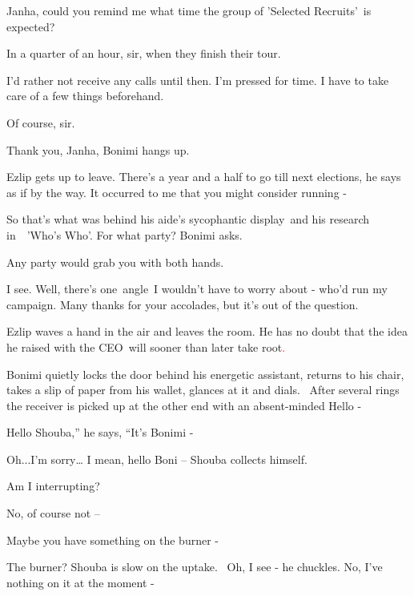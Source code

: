 \documentclass[letterpaper]{article}
\begin{document}
{\textquotedbl}Janha, could you remind me what time the group of {}'Selected Recruits{}'\textcolor{red}{\ }is
expected?{\textquotedbl}

{\textquotedbl}In a quarter of an hour, sir, when they finish their tour.{\textquotedbl} 

{\textquotedbl}I'd rather not receive any calls until then. I'm pressed for time. I have to take care of a few things
beforehand.{\textquotedbl} 

{\textquotedbl}Of course, sir.{\textquotedbl} 

{\textquotedbl}Thank you, Janha,{\textquotedbl} Bonimi hangs up. 

Ezlip gets up to leave. {\textquotedbl}There's a year and a half to go till next elections,{\textquotedbl} he says as if
by the way. {\textquotedbl}It occurred to me that you might consider running -{\textquotedbl}

So that's what was behind his aide's sycophantic display\textcolor{red}{\ }and his research in\ \ {}'Who's Who{}'.
{\textquotedbl}For what party?{\textquotedbl} Bonimi asks.

{\textquotedbl}Any party would grab you with both hands.{\textquotedbl} 

{\textquotedbl}I see. Well, there's one\ angle\ I wouldn't have to worry about - who'd run my campaign. Many thanks for
your accolades, but it's out of the question.{\textquotedbl}\ 

Ezlip waves a hand in the air and leaves the room. He has no doubt that the idea he raised with the CEO~will sooner than
later take root\textcolor{red}{.\ }

Bonimi quietly locks the door behind his energetic assistant, returns to his chair, takes a slip of paper from his
wallet, glances at it and dials.~ After several rings the receiver is picked up at the other end with an absent-minded
{\textquotedbl}Hello -{\textquotedbl}\ 

{\textquotedbl}Hello Shouba,'' he says, ``It's Bonimi -{\textquotedbl} 

{\textquotedbl}Oh...I'm sorry{\dots} I mean, hello Boni --{\textquotedbl} Shouba collects himself.

{\textquotedbl}Am I interrupting?{\textquotedbl} 

{\textquotedbl}No, of course not --{\textquotedbl} 

{\textquotedbl}Maybe you have something on the burner -{\textquotedbl} 

{\textquotedbl}The burner?{\textquotedbl} Shouba is slow on the uptake. ~{\textquotedbl}Oh, I see -{\textquotedbl} he
chuckles. {\textquotedbl}No, I've nothing on it at the moment -{\textquotedbl} 
\end{document}
